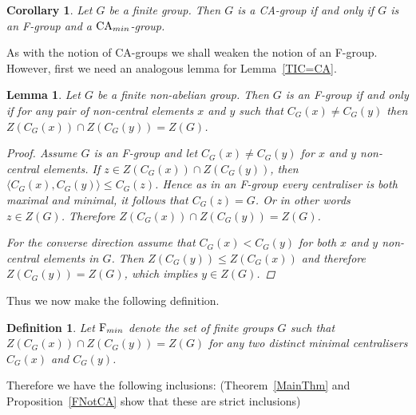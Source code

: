 \documentclass[a4paper,11pt]{article}
\theoremstyle{plain}
\newtheorem{cor}[thm]{Corollary}
\newtheorem{df}[thm]{Definition}
\newtheorem{lm}[thm]{Lemma}
\numberwithin{thm}{section}
\begin{document}
\begin{cor}\label{CA=D+F}
Let $G$ be a finite group.
Then $G$ is a CA-group if and only if $G$ is an F-group and a ${\rm CA}_{min}$-group.
\end{cor}
 
As with the notion of CA-groups we shall weaken the notion of an F-group.
However, first we need an analogous lemma for Lemma~\ref{TIC=CA}.

\begin{lm}\label{CentralTIC=F}
Let $G$ be a finite non-abelian group.
Then $G$ is an F-group if and only if for any pair of non-central elements $x$ and $y$ such that $C_G(x)\ne C_G(y)$ then $Z(C_G(x))\cap Z(C_G(y))=Z(G)$.
\begin{proof}

Assume $G$ is an F-group and let $C_G(x)\ne C_G(y)$ for $x$ and $y$ non-central elements.
If $z\in Z(C_G(x))\cap Z(C_G(y))$, then $\langle C_G(x),C_G(y)\rangle \leq C_G(z)$. 
Hence as in an F-group every centraliser is both maximal and minimal, it follows that $C_G(z)=G$.
Or in other words $z\in Z(G)$.
Therefore $Z(C_G(x))\cap Z(C_G(y))=Z(G)$.

For the converse direction assume that $C_G(x)<C_G(y)$ for both $x$ and $y$ non-central elements in $G$.
Then $Z(C_G(y))\leq Z(C_G(x))$ and therefore $Z(C_G(y))=Z(G)$, which implies $y\in Z(G)$.
\end{proof}
\end{lm}

Thus we now make the following definition.

\begin{df}
Let ${\rm F}_{min}$ denote the set of finite groups $G$ such that $Z(C_G(x))\cap Z(C_G(y))=Z(G)$ for any two distinct minimal centralisers $C_G(x)$ and $C_G(y)$. 
\end{df}

Therefore we have the following inclusions:
(Theorem~\ref{MainThm} and Proposition~\ref{FNotCA} show that these are strict inclusions) 

\begin{center}
\end{center}
\end{document}
